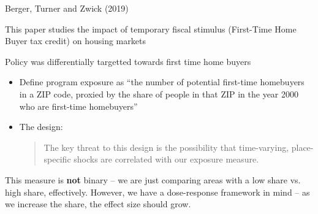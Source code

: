 \documentclass[notes,11pt, aspectratio=169]{beamer}
\newenvironment{wideitemize}{\itemize\addtolength{\itemsep}{10pt}}{\enditemize}
\begin{document}
\begin{frame}{Berger, Turner and Zwick (2019)}
  \begin{wideitemize}
  \item This paper studies the impact of temporary fiscal stimulus
    (First-Time Home Buyer tax credit) on housing markets
  \item Policy was differentially targetted towards first time home buyers
    \begin{itemize}
    \item Define program exposure as ``the number of potential
      first-time homebuyers in a ZIP code, proxied by the share of
      people in that ZIP in the year 2000 who are first-time
      homebuyers''
    \item The design:
      \begin{quote}
        The key threat to this design is the possibility that
        time-varying, place-specific shocks are correlated with our
        exposure measure.
      \end{quote}
    \end{itemize}
  \item This measure is \textbf{not} binary -- we are just comparing
    areas with a low share vs. high share, effectively. However, we
    have a dose-response framework in mind -- as we increase the
    share, the effect size should grow.
  \end{wideitemize}
\end{frame}
\end{document}
